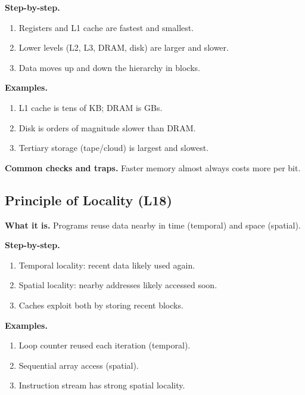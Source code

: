 \documentclass[11pt]{article}
\begin{document}
\textbf{Step-by-step.}
\begin{enumerate}[leftmargin=*]
  \item Registers and L1 cache are fastest and smallest.
  \item Lower levels (L2, L3, DRAM, disk) are larger and slower.
  \item Data moves up and down the hierarchy in blocks.
\end{enumerate}

\textbf{Examples.}
\begin{enumerate}[leftmargin=*]
  \item L1 cache is tens of KB; DRAM is GBs.
  \item Disk is orders of magnitude slower than DRAM.
  \item Tertiary storage (tape/cloud) is largest and slowest.
\end{enumerate}

\textbf{Common checks and traps.} Faster memory almost always costs more per bit.

\begin{figure}[h]
\centering
{}
\end{figure}

\subsection{Principle of Locality (L18)}
\textbf{What it is.} Programs reuse data nearby in time (temporal) and space (spatial).

\textbf{Step-by-step.}
\begin{enumerate}[leftmargin=*]
  \item Temporal locality: recent data likely used again.
  \item Spatial locality: nearby addresses likely accessed soon.
  \item Caches exploit both by storing recent blocks.
\end{enumerate}

\textbf{Examples.}
\begin{enumerate}[leftmargin=*]
  \item Loop counter reused each iteration (temporal).
  \item Sequential array access (spatial).
  \item Instruction stream has strong spatial locality.
\end{enumerate}
\end{document}

